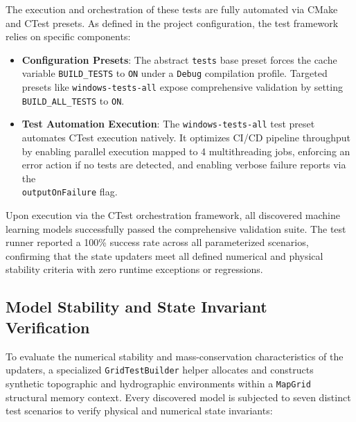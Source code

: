 The execution and orchestration of these tests are fully automated via CMake and CTest presets. As defined in the project configuration, 
the test framework relies on specific components:

\begin{itemize}
    \item \textbf{Configuration Presets}: The abstract \texttt{tests} base preset forces the cache variable \texttt{BUILD\_TESTS} to 
    \texttt{ON} under a \texttt{Debug} compilation profile. Targeted presets like \texttt{windows-tests-all} expose comprehensive validation 
    by setting \\ \texttt{BUILD\_ALL\_TESTS} to \texttt{ON}.

    \item \textbf{Test Automation Execution}: The \texttt{windows-tests-all} test preset automates CTest execution natively. It optimizes 
    CI/CD pipeline throughput by enabling parallel execution mapped to 4 multithreading jobs, enforcing an error action if no tests are 
    detected, and enabling verbose failure reports via the \\ \texttt{outputOnFailure} flag.
\end{itemize}

Upon execution via the CTest orchestration framework, all discovered machine learning models successfully passed the comprehensive 
validation suite. The test runner reported a 100\% success rate across all parameterized scenarios, confirming that the state updaters 
meet all defined numerical and physical stability criteria with zero runtime exceptions or regressions.

\subsection{Model Stability and State Invariant Verification}

To evaluate the numerical stability and mass-conservation characteristics of the updaters, a specialized \texttt{GridTestBuilder} helper 
allocates and constructs synthetic topographic and hydrographic environments within a \texttt{MapGrid} structural memory context. Every 
discovered model is subjected to seven distinct test scenarios to verify physical and numerical state invariants:

